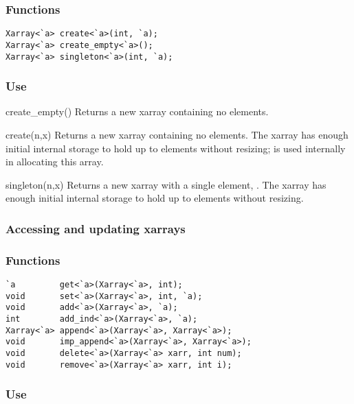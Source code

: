 \subsubsection*{Functions}
\begin{verbatim}
Xarray<`a> create<`a>(int, `a);
Xarray<`a> create_empty<`a>();
Xarray<`a> singleton<`a>(int, `a);
\end{verbatim}

\subsubsection*{Use}

\begin{defun}{create_empty}{()}
Returns a new xarray containing no elements.
\end{defun}

\begin{defun}{create}{(n,x)}
Returns a new xarray containing no elements.  The xarray has enough
initial internal storage to hold up to  elements without
resizing;  is used internally in allocating this array.
\end{defun}

\begin{defun}{singleton}{(n,x)}
Returns a new xarray with a single element, .  The xarray has
enough initial internal storage to hold up to  elements without
resizing.
\end{defun}

\subsubsection*{Accessing and updating xarrays}
\subsubsection*{Functions}
\begin{verbatim}
`a         get<`a>(Xarray<`a>, int);
void       set<`a>(Xarray<`a>, int, `a);
void       add<`a>(Xarray<`a>, `a);
int        add_ind<`a>(Xarray<`a>, `a);
Xarray<`a> append<`a>(Xarray<`a>, Xarray<`a>);
void       imp_append<`a>(Xarray<`a>, Xarray<`a>);
void       delete<`a>(Xarray<`a> xarr, int num);
void       remove<`a>(Xarray<`a> xarr, int i);
\end{verbatim}

\subsubsection*{Use}

